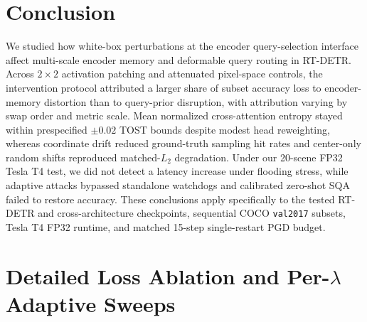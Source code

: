 \documentclass[preprint,10pt]{elsarticle}
\begin{document}
\section{Conclusion}
\label{sec:conclusion}
We studied how white-box perturbations at the encoder query-selection interface affect multi-scale encoder memory and deformable query routing in RT-DETR. Across $2 \times 2$ activation patching and attenuated pixel-space controls, the intervention protocol attributed a larger share of subset accuracy loss to encoder-memory distortion than to query-prior disruption, with attribution varying by swap order and metric scale. Mean normalized cross-attention entropy stayed within prespecified $\pm 0.02$ TOST bounds despite modest head reweighting, whereas coordinate drift reduced ground-truth sampling hit rates and center-only random shifts reproduced matched-$L_2$ degradation. Under our 20-scene FP32 Tesla T4 test, we did not detect a latency increase under flooding stress, while adaptive attacks bypassed standalone watchdogs and calibrated zero-shot SQA failed to restore accuracy. These conclusions apply specifically to the tested RT-DETR and cross-architecture checkpoints, sequential COCO \texttt{val2017} subsets, Tesla T4 FP32 runtime, and matched 15-step single-restart PGD budget.

\appendix
\setcounter{table}{0}
\renewcommand{\thetable}{A.\arabic{table}}
\section{Detailed Loss Ablation and Per-$\lambda$ Adaptive Sweeps}
\label{app:detailed_tables}
\end{document}
